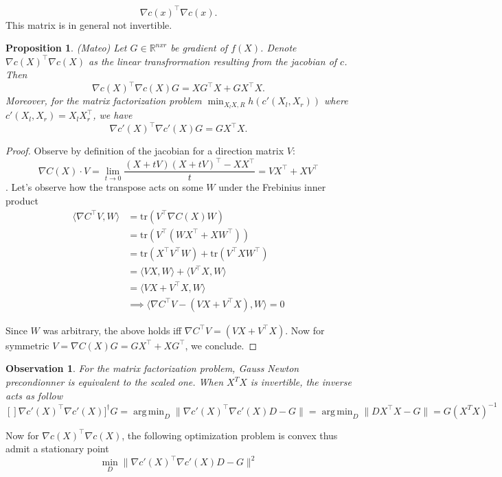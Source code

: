 \documentclass{article}
\newtheorem{proposition}{Proposition}
\newtheorem{observation}{Observation}
\DeclareMathOperator*{\argmin}{arg\,min}
\begin{document}
$$
\nabla c(x)^\top \nabla c(x).
$$
This matrix is in general not invertible.


\begin{proposition} (Mateo)
    Let $G \in \mathbb{R}^{nxr}$ be gradient of $f(X)$. Denote $\nabla c(X)^\top \nabla c(X)$ as the linear transfrormation resulting from the jacobian of $c$. Then
    $$
     \nabla c(X)^\top \nabla c(X) G = XG^\top X + GX^\top X. 
    $$ Moreover, for the matrix factorization problem $\min_{X_l X,R} h(c'(X_l,X_r)) $ where $c'(X_l,X_r) = X_l X_r^\top$, we have  
    $$
    \nabla c'(X)^\top \nabla c'(X) G = GX^\top X. 
    $$
    
\end{proposition}
\begin{proof}
    Observe by definition of the jacobian for a direction matrix $V$: $$\nabla C(X) \cdot  V =  \lim_{t\to 0}  \frac{(X+tV)(X+tV)^\top - XX^\top   }{t} = VX^\top + XV^\top$$.
    Let's observe how the transpose acts on some $W$ under the Frebinius inner product
\begin{align*}
    \langle \nabla C^\top V, W \rangle & = \text{tr}(V^\top \nabla C(X) W) \\
    & = \text{tr}( V^\top (WX^\top + XW^\top)) \\
    & = \text{tr}(X^\top V^\top W) + \text{tr}(V^\top X W^\top) \\
    & = \langle V X, W \rangle + \langle V^\top X, W \rangle \\
    & = \langle VX + V^\top X, W \rangle \\
    & \implies \langle \nabla C^\top V -  (VX + V^\top X), W \rangle = 0
\end{align*}

    Since $W$ was arbitrary, the above holds iff $ \nabla C^\top V = (V X + V^\top X)$. Now for symmetric $V= \nabla C(X) G = GX^\top + X G^\top$, we conclude.
\end{proof}


\begin{observation}
For the matrix factorization problem, Gauss Newton precondionner is equivalent to the scaled one. When $X^TX$ is invertible, the inverse acts as follow
$$
[] \nabla c'(X)^\top \nabla c'(X) ]^{\dagger} G = \argmin_{D} \| \nabla c'(X)^\top \nabla c'(X) D - G \| = \argmin_{D} \| DX^\top X - G \|  = G(X^TX)^{-1}
$$
\end{observation}

Now for $\nabla c(X)^\top \nabla c(X)$, the following optimization problem is convex thus admit a stationary point 
$$
\min_{D} \| \nabla c'(X)^\top \nabla c'(X) D - G \|^2
$$
\end{document}
